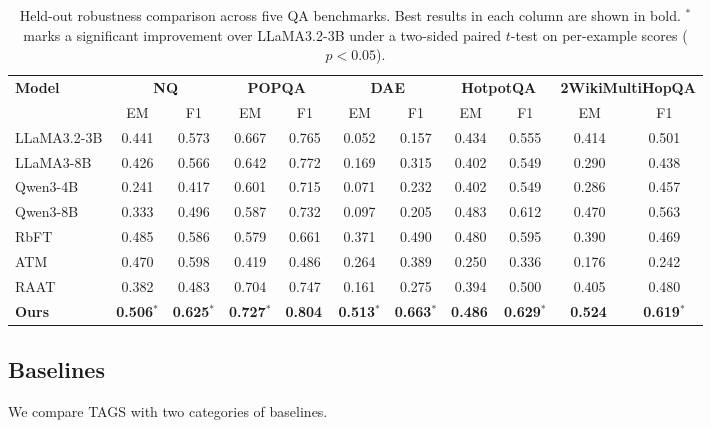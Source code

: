 \documentclass[11pt]{article}
\begin{document}
\begin{table}[t]
\caption{Held-out robustness comparison across five QA benchmarks. Best results in each column are shown in bold. $^*$ marks a significant improvement over LLaMA3.2-3B under a two-sided paired $t$-test on per-example scores ($p<0.05$).}
\label{tab:rag_robustness}
\centering
\small
\setlength{\tabcolsep}{5pt}
\renewcommand{\arraystretch}{1.05}
\begin{tabular*}{\textwidth}{@{\extracolsep{\fill}}lcccccccccc}
\toprule
\textbf{Model} 
& \multicolumn{2}{c}{\textbf{NQ}} 
& \multicolumn{2}{c}{\textbf{POPQA}} 
& \multicolumn{2}{c}{\textbf{DAE}} 
& \multicolumn{2}{c}{\textbf{HotpotQA}} 
& \multicolumn{2}{c}{\textbf{2WikiMultiHopQA}} \\
\cmidrule(lr){2-3}\cmidrule(lr){4-5}\cmidrule(lr){6-7}\cmidrule(lr){8-9}\cmidrule(lr){10-11}
& EM & F1 & EM & F1 & EM & F1 & EM & F1 & EM & F1 \\
\midrule
LLaMA3.2-3B  & 0.441 & 0.573 & 0.667 & 0.765 & 0.052 & 0.157 & 0.434 & 0.555 & 0.414 & 0.501 \\
LLaMA3-8B    & 0.426 & 0.566 & 0.642 & 0.772 & 0.169 & 0.315 & 0.402 & 0.549 & 0.290 & 0.438 \\
Qwen3-4B     & 0.241 & 0.417 & 0.601 & 0.715 & 0.071 & 0.232 & 0.402 & 0.549 & 0.286 & 0.457 \\
Qwen3-8B     & 0.333 & 0.496 & 0.587 & 0.732 & 0.097 & 0.205 & 0.483 & 0.612 & 0.470 & 0.563 \\
RbFT         & 0.485 & 0.586 & 0.579 & 0.661 & 0.371 & 0.490 & 0.480 & 0.595 & 0.390 & 0.469 \\
ATM          & 0.470 & 0.598 & 0.419 & 0.486 & 0.264 & 0.389 & 0.250 & 0.336 & 0.176 & 0.242 \\
RAAT         & 0.382 & 0.483 & 0.704 & 0.747 & 0.161 & 0.275 & 0.394 & 0.500 & 0.405 & 0.480 \\
\midrule
\textbf{Ours} 
& \textbf{0.506}$^{*}$ & \textbf{0.625}$^{*}$ 
& \textbf{0.727}$^{*}$ & \textbf{0.804}$\,$ 
& \textbf{0.513}$^{*}$ & \textbf{0.663}$^{*}$ 
& \textbf{0.486}$\,$ & \textbf{0.629}$^{*}$ 
& \textbf{0.524}$\,$ & \textbf{0.619}$^{*}$ \\
\bottomrule
\end{tabular*}
\end{table}

\subsection{Baselines}

We compare TAGS with two categories of baselines.
\end{document}
